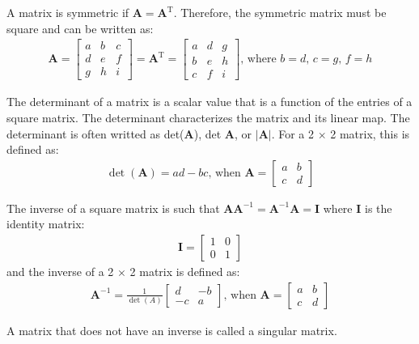 \documentclass[12pt,letter]{article}
\begin{document}
\begin{review}
A matrix is symmetric if $\textbf{A} =\textbf{A}^\text{T}$. Therefore, the symmetric matrix must be square and can be written as:
\begin{eqnarray}
\textbf{A} = \begin{bmatrix} a & b &c \\ d & e & f\\ g & h & i \end{bmatrix} = \textbf{A}^\text{T} = \begin{bmatrix} a & d & g \\ b & e & h \\ c & f & i \end{bmatrix}\text{, where } b=d \text{, }c=g\text{, }f=h
\end{eqnarray}

The determinant of a matrix is a scalar value that is a function of the entries of a square matrix. The determinant characterizes the matrix and its linear map. The determinant is often writted as det($\textbf{A}$), det $\textbf{A}$, or $|\textbf{A}|$. For a 2 $\times$ 2 matrix, this is defined as:
\begin{eqnarray}
\det (\textbf{A}) = ad-bc  \text{, when } \textbf{A} = \begin{bmatrix} a & b \\ c & d \end{bmatrix}
\end{eqnarray}

The inverse of a square matrix is such that $\textbf{A}\textbf{A}^{-1} = \textbf{A}^{-1}\textbf{A}=\textbf{I}$ where $\textbf{I}$ is the identity matrix:
\begin{eqnarray}
\textbf{I} = \begin{bmatrix} 1 & 0 \\ 0 & 1 \end{bmatrix} 
\end{eqnarray}
and the inverse of a 2 $\times$ 2 matrix is defined as:
\begin{eqnarray}
\textbf{A}^{-1} = \frac{1}{\det (A)} \begin{bmatrix} d & -b \\ -c & a \end{bmatrix} \text{, when } \textbf{A} = \begin{bmatrix} a & b \\ c & d \end{bmatrix}
\end{eqnarray}

A matrix that does not have an inverse is called a singular matrix.


\end{review}
  \vspace{-2ex} 
\end{document}
